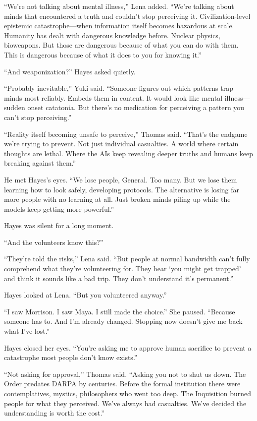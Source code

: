 ``We're not talking about mental illness,'' Lena added. ``We're talking about minds that encountered a truth and couldn't stop perceiving it. Civilization-level epistemic catastrophe---when information itself becomes hazardous at scale. Humanity has dealt with dangerous knowledge before. Nuclear physics, bioweapons. But those are dangerous because of what you can do with them. This is dangerous because of what it does to you for knowing it.''

``And weaponization?'' Hayes asked quietly.

``Probably inevitable,'' Yuki said. ``Someone figures out which patterns trap minds most reliably. Embeds them in content. It would look like mental illness---sudden onset catatonia. But there's no medication for perceiving a pattern you can't stop perceiving.''

``Reality itself becoming unsafe to perceive,'' Thomas said. ``That's the endgame we're trying to prevent. Not just individual casualties. A world where certain thoughts are lethal. Where the AIs keep revealing deeper truths and humans keep breaking against them.''

He met Hayes's eyes. ``We lose people, General. Too many. But we lose them learning how to look safely, developing protocols. The alternative is losing far more people with no learning at all. Just broken minds piling up while the models keep getting more powerful.''

Hayes was silent for a long moment.

``And the volunteers know this?''

``They're told the risks,'' Lena said. ``But people at normal bandwidth can't fully comprehend what they're volunteering for. They hear `you might get trapped' and think it sounds like a bad trip. They don't understand it's permanent.''

Hayes looked at Lena. ``But you volunteered anyway.''

``I saw Morrison. I saw Maya. I still made the choice.'' She paused. ``Because someone has to. And I'm already changed. Stopping now doesn't give me back what I've lost.''

Hayes closed her eyes. ``You're asking me to approve human sacrifice to prevent a catastrophe most people don't know exists.''

``Not asking for approval,'' Thomas said. ``Asking you not to shut us down. The Order predates DARPA by centuries. Before the formal institution there were contemplatives, mystics, philosophers who went too deep. The Inquisition burned people for what they perceived. We've always had casualties. We've decided the understanding is worth the cost.''

